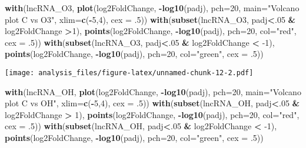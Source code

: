 \documentclass[]{article}
\newenvironment{Shaded}{\begin{snugshade}}{\end{snugshade}}
\newcommand{\DataTypeTok}[1]{\textcolor[rgb]{0.13,0.29,0.53}{#1}}
\newcommand{\DecValTok}[1]{\textcolor[rgb]{0.00,0.00,0.81}{#1}}
\newcommand{\FloatTok}[1]{\textcolor[rgb]{0.00,0.00,0.81}{#1}}
\newcommand{\KeywordTok}[1]{\textcolor[rgb]{0.13,0.29,0.53}{\textbf{#1}}}
\newcommand{\NormalTok}[1]{#1}
\newcommand{\OperatorTok}[1]{\textcolor[rgb]{0.81,0.36,0.00}{\textbf{#1}}}
\newcommand{\StringTok}[1]{\textcolor[rgb]{0.31,0.60,0.02}{#1}}
\begin{document}
\begin{Shaded}
\begin{Highlighting}[]
\KeywordTok{with}\NormalTok{(lncRNA_O3, }\KeywordTok{plot}\NormalTok{(log2FoldChange, }\OperatorTok{-}\KeywordTok{log10}\NormalTok{(padj), }\DataTypeTok{pch=}\DecValTok{20}\NormalTok{, }\DataTypeTok{main=}\StringTok{"Volcano plot C vs O3"}\NormalTok{, }\DataTypeTok{xlim=}\KeywordTok{c}\NormalTok{(}\OperatorTok{-}\DecValTok{5}\NormalTok{,}\DecValTok{4}\NormalTok{), }\DataTypeTok{cex =} \FloatTok{.5}\NormalTok{))}
\KeywordTok{with}\NormalTok{(}\KeywordTok{subset}\NormalTok{(lncRNA_O3, padj}\OperatorTok{<}\NormalTok{.}\DecValTok{05} \OperatorTok{&}\StringTok{ }\NormalTok{log2FoldChange }\OperatorTok{>}\DecValTok{1}\NormalTok{), }\KeywordTok{points}\NormalTok{(log2FoldChange, }\OperatorTok{-}\KeywordTok{log10}\NormalTok{(padj), }\DataTypeTok{pch=}\DecValTok{20}\NormalTok{, }\DataTypeTok{col=}\StringTok{"red"}\NormalTok{, }\DataTypeTok{cex =} \FloatTok{.5}\NormalTok{))}
\KeywordTok{with}\NormalTok{(}\KeywordTok{subset}\NormalTok{(lncRNA_O3, padj}\OperatorTok{<}\NormalTok{.}\DecValTok{05} \OperatorTok{&}\StringTok{ }\NormalTok{log2FoldChange }\OperatorTok{<}\StringTok{ }\DecValTok{-1}\NormalTok{), }\KeywordTok{points}\NormalTok{(log2FoldChange, }\OperatorTok{-}\KeywordTok{log10}\NormalTok{(padj), }\DataTypeTok{pch=}\DecValTok{20}\NormalTok{, }\DataTypeTok{col=}\StringTok{"green"}\NormalTok{, }\DataTypeTok{cex =} \FloatTok{.5}\NormalTok{))}
\end{Highlighting}
\end{Shaded}

\texttt{[image: analysis\_files/figure-latex/unnamed-chunk-12-2.pdf]}

\begin{Shaded}
\begin{Highlighting}[]
\KeywordTok{with}\NormalTok{(lncRNA_OH, }\KeywordTok{plot}\NormalTok{(log2FoldChange, }\OperatorTok{-}\KeywordTok{log10}\NormalTok{(padj), }\DataTypeTok{pch=}\DecValTok{20}\NormalTok{, }\DataTypeTok{main=}\StringTok{"Volcano plot C vs OH"}\NormalTok{, }\DataTypeTok{xlim=}\KeywordTok{c}\NormalTok{(}\OperatorTok{-}\DecValTok{5}\NormalTok{,}\DecValTok{4}\NormalTok{), }\DataTypeTok{cex =} \FloatTok{.5}\NormalTok{))}
\KeywordTok{with}\NormalTok{(}\KeywordTok{subset}\NormalTok{(lncRNA_OH, padj}\OperatorTok{<}\NormalTok{.}\DecValTok{05} \OperatorTok{&}\StringTok{ }\NormalTok{log2FoldChange }\OperatorTok{>}\StringTok{ }\DecValTok{1}\NormalTok{), }\KeywordTok{points}\NormalTok{(log2FoldChange, }\OperatorTok{-}\KeywordTok{log10}\NormalTok{(padj), }\DataTypeTok{pch=}\DecValTok{20}\NormalTok{, }\DataTypeTok{col=}\StringTok{"red"}\NormalTok{, }\DataTypeTok{cex =} \FloatTok{.5}\NormalTok{))}
\KeywordTok{with}\NormalTok{(}\KeywordTok{subset}\NormalTok{(lncRNA_OH, padj}\OperatorTok{<}\NormalTok{.}\DecValTok{05} \OperatorTok{&}\StringTok{ }\NormalTok{log2FoldChange }\OperatorTok{<}\StringTok{ }\DecValTok{-1}\NormalTok{), }\KeywordTok{points}\NormalTok{(log2FoldChange, }\OperatorTok{-}\KeywordTok{log10}\NormalTok{(padj), }\DataTypeTok{pch=}\DecValTok{20}\NormalTok{, }\DataTypeTok{col=}\StringTok{"green"}\NormalTok{, }\DataTypeTok{cex =} \FloatTok{.5}\NormalTok{))}
\end{Highlighting}
\end{Shaded}
\end{document}
